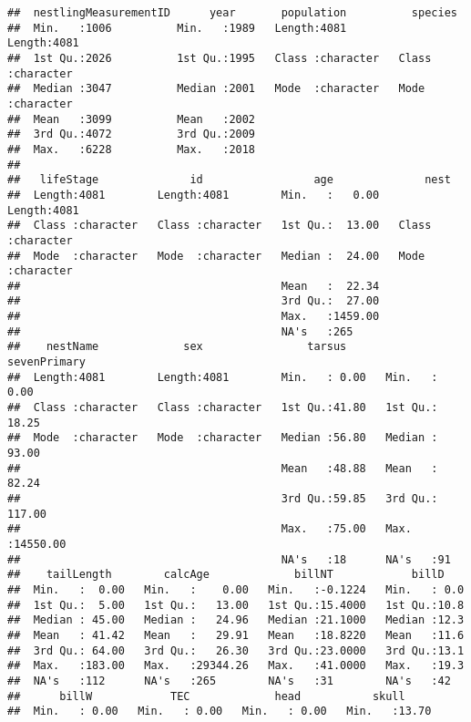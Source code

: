 \documentclass[
]{article}
\begin{document}
\begin{verbatim}
##  nestlingMeasurementID      year       population          species         
##  Min.   :1006          Min.   :1989   Length:4081        Length:4081       
##  1st Qu.:2026          1st Qu.:1995   Class :character   Class :character  
##  Median :3047          Median :2001   Mode  :character   Mode  :character  
##  Mean   :3099          Mean   :2002                                        
##  3rd Qu.:4072          3rd Qu.:2009                                        
##  Max.   :6228          Max.   :2018                                        
##                                                                            
##   lifeStage              id                 age              nest          
##  Length:4081        Length:4081        Min.   :   0.00   Length:4081       
##  Class :character   Class :character   1st Qu.:  13.00   Class :character  
##  Mode  :character   Mode  :character   Median :  24.00   Mode  :character  
##                                        Mean   :  22.34                     
##                                        3rd Qu.:  27.00                     
##                                        Max.   :1459.00                     
##                                        NA's   :265                         
##    nestName             sex                tarsus       sevenPrimary     
##  Length:4081        Length:4081        Min.   : 0.00   Min.   :    0.00  
##  Class :character   Class :character   1st Qu.:41.80   1st Qu.:   18.25  
##  Mode  :character   Mode  :character   Median :56.80   Median :   93.00  
##                                        Mean   :48.88   Mean   :   82.24  
##                                        3rd Qu.:59.85   3rd Qu.:  117.00  
##                                        Max.   :75.00   Max.   :14550.00  
##                                        NA's   :18      NA's   :91        
##    tailLength        calcAge             billNT            billD     
##  Min.   :  0.00   Min.   :    0.00   Min.   :-0.1224   Min.   : 0.0  
##  1st Qu.:  5.00   1st Qu.:   13.00   1st Qu.:15.4000   1st Qu.:10.8  
##  Median : 45.00   Median :   24.96   Median :21.1000   Median :12.3  
##  Mean   : 41.42   Mean   :   29.91   Mean   :18.8220   Mean   :11.6  
##  3rd Qu.: 64.00   3rd Qu.:   26.30   3rd Qu.:23.0000   3rd Qu.:13.1  
##  Max.   :183.00   Max.   :29344.26   Max.   :41.0000   Max.   :19.3  
##  NA's   :112      NA's   :265        NA's   :31        NA's   :42    
##      billW            TEC             head           skull      
##  Min.   : 0.00   Min.   : 0.00   Min.   : 0.00   Min.   :13.70  

\end{verbatim}
\end{document}
